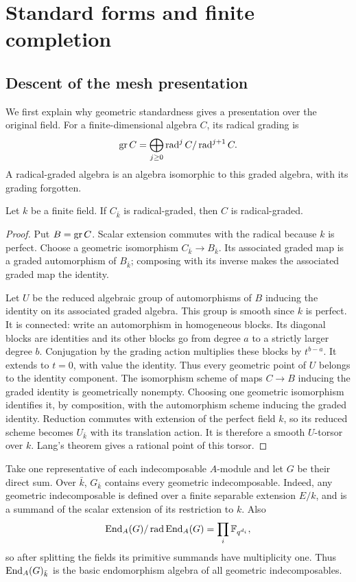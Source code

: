 \section{Standard forms and finite completion}\label{sec:structure}
\subsection{Descent of the mesh presentation}

We first explain why geometric standardness gives a presentation over the original field. For a finite-dimensional algebra $C$, its radical grading is
\[
 \operatorname{gr} C=\bigoplus_{j\geq0}\operatorname{rad}^j C/\operatorname{rad}^{j+1}C.
\]
A radical-graded algebra is an algebra isomorphic to this graded algebra, with its grading forgotten.

\begin{lemma}\label{lem:grading}
Let $k$ be a finite field. If $C_{\bar k}$ is radical-graded, then $C$ is radical-graded.
\end{lemma}
\begin{proof}
Put $B=\operatorname{gr} C$. Scalar extension commutes with the radical because $k$ is perfect. Choose a geometric isomorphism $C_{\bar k}\to B_{\bar k}$. Its associated graded map is a graded automorphism of $B_{\bar k}$; composing with its inverse makes the associated graded map the identity.

Let $U$ be the reduced algebraic group of automorphisms of $B$ inducing the identity on its associated graded algebra. This group is smooth since $k$ is perfect. It is connected: write an automorphism in homogeneous blocks. Its diagonal blocks are identities and its other blocks go from degree $a$ to a strictly larger degree $b$. Conjugation by the grading action multiplies these blocks by $t^{b-a}$. It extends to $t=0$, with value the identity. Thus every geometric point of $U$ belongs to the identity component. The isomorphism scheme of maps $C\to B$ inducing the graded identity is geometrically nonempty. Choosing one geometric isomorphism identifies it, by composition, with the automorphism scheme inducing the graded identity. Reduction commutes with extension of the perfect field $k$, so its reduced scheme becomes $U_{\bar k}$ with its translation action. It is therefore a smooth $U$-torsor over $k$. Lang's theorem \cite{Lang} gives a rational point of this torsor.
\end{proof}


Take one representative of each indecomposable $A$-module and let $G$ be their direct sum. Over $\bar k$, $G_{\bar k}$ contains every geometric indecomposable. Indeed, any geometric indecomposable is defined over a finite separable extension $E/k$, and is a summand of the scalar extension of its restriction to $k$. Also
\[
 \operatorname{End}_A(G)/\operatorname{rad}\operatorname{End}_A(G)=\prod_i\mathbb F_{q^{d_i}},
\]
so after splitting the fields its primitive summands have multiplicity one. Thus $\operatorname{End}_A(G)_{\bar k}$ is the basic endomorphism algebra of all geometric indecomposables.

